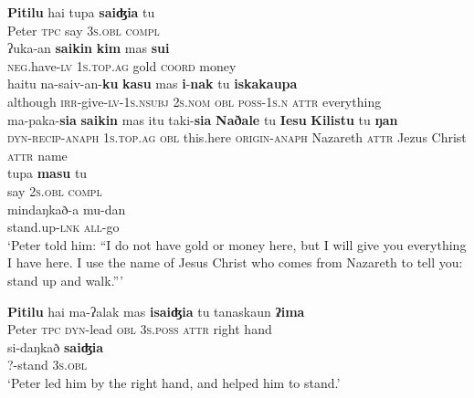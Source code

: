\documentclass[output=paper
,modfonts
,nonflat]{langsci/langscibook}
\begin{document}
\begin{exe}
	\label{tx3-6}
	\begin{xlist}
		\ex\label{tx3-6a}
		\gll \textbf{Pitilu}  hai  tupa  \textbf{saiʤia}  tu\\
		Peter  \textsc{tpc}  say  \textsc{3s}.\textsc{obl}  \textsc{compl}\\
		\ex\label{tx3-6b}
		\gll ʔuka-an  \textbf{saikin}  \textbf{kim}  mas  \textbf{sui}\\
		\textsc{neg}.have-\textsc{lv}  \textsc{1s}.\textsc{top}.\textsc{ag}   gold  \textsc{coord}  money\\
		\ex\label{tx3-6c}
		\gll haitu  na-saiv-an-\textbf{ku}  \textbf{kasu}  mas  \textbf{i}-\textbf{nak}  tu  \textbf{iskakaupa}\\
		although  \textsc{irr}-give-\textsc{lv}-\textsc{1s}.\textsc{nsubj}  \textsc{2s}.\textsc{nom}  \textsc{obl}  \textsc{poss}-\textsc{1s}.\textsc{n}  \textsc{attr}  everything\\
		\ex\label{tx3-6d}
		\gll ma-paka-\textbf{sia}  \textbf{saikin}  mas  itu  taki-\textbf{sia}  \textbf{Naðale}  tu  \textbf{Iesu}  \textbf{Kilistu}  tu  \textbf{ŋan}\\
		\textsc{dyn}-\textsc{recip}-\textsc{anaph}  \textsc{1s}.\textsc{top}.\textsc{ag}  \textsc{obl}  this.here  \textsc{origin}-\textsc{anaph}  Nazareth  \textsc{attr}  Jezus  Christ  \textsc{attr}  name\\
		\ex\label{tx3-6e}
		\gll tupa  \textbf{masu}  tu\\
		say  \textsc{2s}.\textsc{obl}  \textsc{compl}\\
		\ex\label{tx3-6f}
		\gll mindaŋkað-a  mu-dan\\
		stand.up-\textsc{lnk}  \textsc{all}-go\\
		\glt `Peter told him: “I do not have gold or money here, but I will give you everything I have here. I use the name of Jesus Christ who comes from Nazareth to tell you: stand up and walk.”’
	\end{xlist}
\end{exe}

\begin{exe}
	\label{tx3-7}
	\begin{xlist}
		\ex\label{tx3-7a}
		\gll \textbf{Pitilu}  hai  ma-ʔalak  mas  \textbf{isaiʤia}  tu  tanaskaun  \textbf{ʔima}\\
		Peter  \textsc{tpc}  \textsc{dyn}-lead  \textsc{obl}  \textsc{3s}.\textsc{poss}  \textsc{attr}  right  hand\\
		\ex\label{tx3-7b}
		\gll si-daŋkað  \textbf{saiʤia}\\
		?-stand  \textsc{3s}.\textsc{obl}\\
		\glt `Peter led him by the right hand, and helped him to stand.’
	\end{xlist}
\end{exe}
\end{document}
